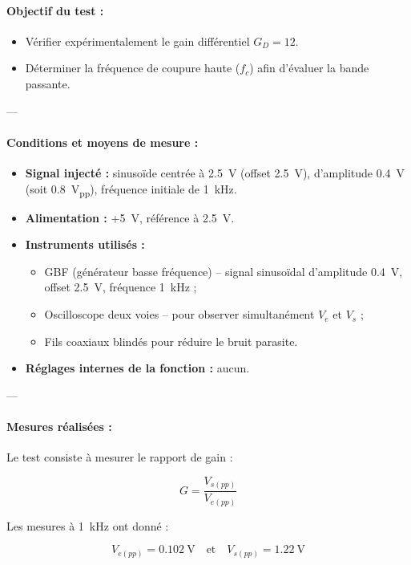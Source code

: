 \documentclass{article}
\begin{document}
\paragraph{Objectif du test :}
\begin{itemize}
    \item Vérifier expérimentalement le gain différentiel $G_D = 12$.
    \item Déterminer la fréquence de coupure haute ($f_c$) afin d'évaluer la bande passante.
\end{itemize}

---

\paragraph{Conditions et moyens de mesure :}

\begin{itemize}
    \item \textbf{Signal injecté :} sinusoïde centrée à 2.5~V (offset 2.5~V), d’amplitude 0.4~V (soit 0.8~V\textsubscript{pp}), fréquence initiale de 1~kHz.
    \item \textbf{Alimentation :} +5~V, référence à 2.5~V.
    \item \textbf{Instruments utilisés :}
    \begin{itemize}
        \item GBF (générateur basse fréquence) – signal sinusoïdal d’amplitude 0.4~V, offset 2.5~V, fréquence 1~kHz ;
        \item Oscilloscope deux voies – pour observer simultanément $V_e$ et $V_s$ ;
        \item Fils coaxiaux blindés pour réduire le bruit parasite.
    \end{itemize}
    \item \textbf{Réglages internes de la fonction :} aucun.
\end{itemize}

---

\paragraph{Mesures réalisées :}

Le test consiste à mesurer le rapport de gain :

\[
G = \frac{V_{s(pp)}}{V_{e(pp)}}
\]

Les mesures à 1~kHz ont donné :

\[
V_{e(pp)} = 0.102~\text{V} \quad\text{et}\quad V_{s(pp)} = 1.22~\text{V}
\]
\end{document}
